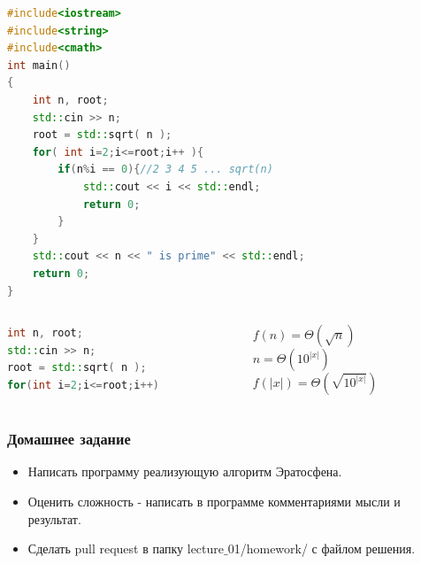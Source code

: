 \documentclass[russian, 12pt]{beamer}
\begin{document}
\lstset{style=mystyle}
\begin{frame}[fragile]
%
\begin{lstlisting}[language=C++]
#include<iostream> 
#include<string>
#include<cmath>
int main()
{
    int n, root;
    std::cin >> n;
    root = std::sqrt( n );
    for( int i=2;i<=root;i++ ){
        if(n%i == 0){//2 3 4 5 ... sqrt(n)
            std::cout << i << std::endl;
            return 0;
        }
    }
    std::cout << n << " is prime" << std::endl;
    return 0;
}  
\end{lstlisting}
\end{frame}
\lstset{style=mystyle}
\begin{frame}[fragile]
\begin{columns}[T] %
\begin{column}{.48\textwidth}
\begin{lstlisting}[language=C++]
int n, root;
std::cin >> n;
root = std::sqrt( n );
for(int i=2;i<=root;i++)
\end{lstlisting}
\end{column}%
\hfill%
\begin{column}{.48\textwidth}
$f(n) = \Theta( \sqrt{n} )$\\[0.3cm]
\pause
$n = \Theta( 10^{|x|} )$\\[0.3cm]
\pause
$f(|x|) = \Theta\left( \sqrt{10^{|x|}} \right)$
\end{column}%
\end{columns} 
\end{frame}
\begin{frame}
\frametitle{Домашнее задание}
\begin{itemize}
  \item Написать программу реализующую алгоритм Эратосфена.
  \item Оценить сложность - написать в программе комментариями мысли и результат.
  \item Сделать pull request в папку lecture$\_$01/homework/ с файлом решения.
\end{itemize}
\end{frame}
\end{document}

